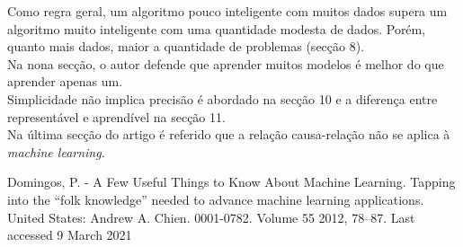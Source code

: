 \documentclass{article}
\begin{document}
Como regra geral, um algoritmo pouco inteligente com muitos dados supera um algoritmo muito inteligente com uma quantidade modesta de dados. Porém, quanto mais dados, maior a quantidade de problemas (secção 8).\\
Na nona secção, o autor defende que aprender muitos modelos é melhor do que aprender apenas um.\\
Simplicidade não implica precisão é abordado na secção 10 e a diferença entre representável e aprendível na secção 11.\\
Na última secção do artigo é referido que a relação causa-relação não se aplica à \textsl{machine learning}. 

\begin{thebibliography}{8}
Domingos, P. - A Few Useful Things to Know About Machine Learning. Tapping into the “folk knowledge” needed to advance machine learning applications. United States: Andrew A. Chien. 0001-0782. Volume 55 2012, 78--87.
Last accessed 9 March 2021
\end{thebibliography}
\end{document}
